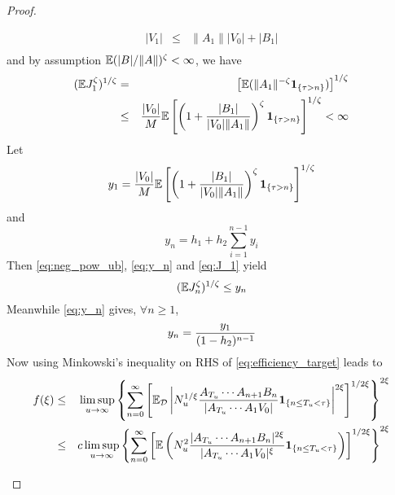 \documentclass{article}
\theoremstyle{remark}
\begin{document}
\begin{proof}
\begin{enumerate}
\begin{eqnarray*}
      |V_1| &\leq& \|A_1\| |V_0| + |B_1| \\
      \end{eqnarray*}
      and by assumption $\mathbb{E} (|B|/\|A\|)^\zeta < \infty$, we have
      \begin{eqnarray}
        (\mathbb{E} J_1^\zeta)^{1/\zeta} &=&
        \left[
        \mathbb{E} (\|A_1\|^{-\zeta}\mathbf{1}_{\{\tau > n\}})
      \right]^{1/\zeta} \nonumber \\
      &\leq&
      {|V_0|\over M} \mathbb{E} \left[\left(
        1 + {|B_1| \over |V_0| \|A_1\|}
      \right)^\zeta
      \mathbf{1}_{\{\tau > n\}}\right]^{1/\zeta}< \infty
    \label{eq:J_1}
    \end{eqnarray}
    Let
    \[
    y_1 = 
    {|V_0|\over M} \mathbb{E} \left[\left(
        1 + {|B_1| \over |V_0| \|A_1\|}
      \right)^\zeta \mathbf{1}_{\{\tau > n\}}\right]^{1/\zeta}
    \]
    and
    \begin{equation}
      \label{eq:y_n}
      y_n = h_1 + h_2 \sum_{i=1}^{n-1} y_i      
    \end{equation}
    Then \eqref{eq:neg_pow_ub}, \eqref{eq:y_n} and \eqref{eq:J_1}
    yield
    \begin{equation}
      \label{eq:J_n_2}
      (\mathbb{E} J_n^\zeta)^{1/\zeta} \leq y_n      
    \end{equation}
    Meanwhile \eqref{eq:y_n} gives, $\forall n \geq 1$,
    \begin{equation}
      \label{eq:y_n_2}
      y_n = {y_1 \over (1 - h_2)^{n-1}}
    \end{equation}
    Now using Minkowski's inequality on RHS of
    \eqref{eq:efficiency_target} leads to
      \begin{eqnarray*}
        f(\xi) &\leq& \limsup_{u \to \infty}
        \left\{
          \sum_{n=0}^{\infty}
          \left[
            \mathbb{E}_{\mathcal D} \left|
              N_u^{1/\xi}
              \frac{
                A_{T_u} \cdots A_{n+1} B_n 
              }{
                |A_{T_u} \cdots A_1 V_0|
              }
              \mathbf{1}_{\{n \leq T_u < \tau\}}
            \right|^{2 \xi}
          \right]^{1/2\xi}
        \right\}^{2\xi} \\
        &\leq& c \limsup_{u \to \infty}
        \left\{
          \sum_{n=0}^{\infty}
          \left[
            \mathbb{E} \left(
              N_u^2
              \frac{
                |A_{T_u} \cdots A_{n+1} B_n|^{2\xi}
              }{
                |A_{T_u} \cdots A_1 V_0|^\xi
              }
              \mathbf{1}_{\{n \leq T_u < \tau\}}
            \right)
          \right]^{1/2\xi}
        \right\}^{2\xi}
      \end{eqnarray*}

\end{enumerate}
\end{proof}
\end{document}
